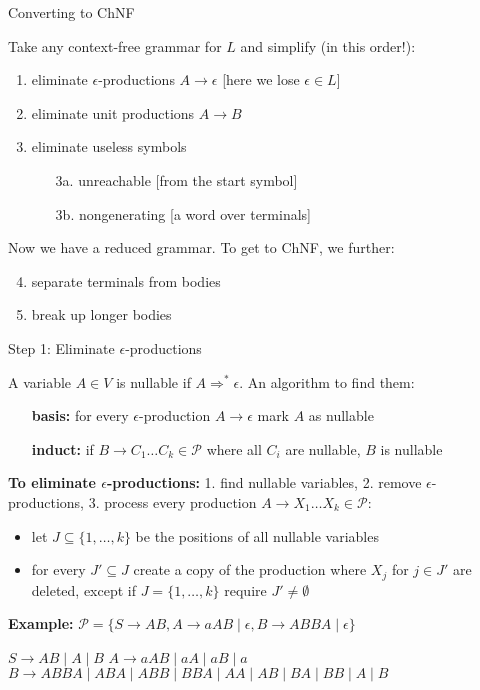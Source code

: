 \documentclass[handout]{beamer}
\begin{document}
\begin{frame}{Converting to ChNF}

	Take any context-free grammar for $L$ and simplify (\alert{in this order!}):
	
	\begin{enumerate}
		\item eliminate \alert{$\epsilon$-productions} $A\rightarrow\epsilon$
		\hfill{\small [here we lose $\epsilon\in L$]}
		\item eliminate \alert{unit productions} $A\rightarrow B$
		\item eliminate \alert{useless} symbols
		\begin{itemize}
			\item[3a.] \alert{unreachable} \hfill[from the start symbol]
			\item[3b.] \alert{nongenerating} \hfill[a word over terminals]
		\end{itemize} 
	\end{enumerate}

	Now we have a \alert{reduced} grammar. To get to ChNF, we further:
		
	\begin{enumerate}\setcounter{enumi}{3}
		\item \alert{separate} terminals from bodies
		\item \alert{break up} longer bodies
	\end{enumerate}

\end{frame}


\begin{frame}{Step 1: Eliminate $\epsilon$-productions}

	A variable $A\in V$ is \alert{nullable} if $A\Rightarrow^* \epsilon$. An algorithm to find them:
	\begin{itemize}
		\item[\textbf{basis:}] for every $\epsilon$-production $A\rightarrow \epsilon$ mark $A$ as nullable
		\item[\textbf{induct:}] if $B\rightarrow C_1 \ldots C_k\in\mathcal P$ where all $C_i$ are nullable, $B$ is nullable
	\end{itemize}

	\textbf{To eliminate $\epsilon$-productions:} 1. find nullable variables, 2. remove $\epsilon$-productions, 3. process every production $A\rightarrow X_1\ldots X_k \in \mathcal P$:
	\begin{itemize}
		\item let $J\subseteq\{1,\dots,k\}$ be the positions of all nullable variables
		\item for every $J'\subseteq J$ create a copy of the production where $X_j$ for $j\in J'$ are deleted, except if $J=\{1,\dots,k\}$ require $J'\neq\emptyset$
	\end{itemize}

	\textbf{Example:} $\mathcal P=\{S\rightarrow AB,A\rightarrow aAB\mid\epsilon,B\rightarrow ABBA\mid\epsilon\}$

	$S\rightarrow AB\mid A\mid B$
	$A\rightarrow aAB\mid aA\mid aB\mid a$
	$B\rightarrow ABBA\mid ABA\mid ABB\mid BBA\mid AA\mid AB\mid BA\mid BB\mid A\mid B$

\end{frame}
\end{document}

